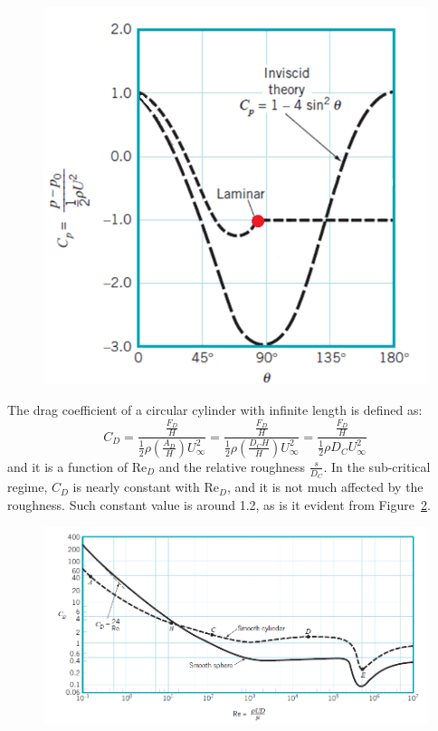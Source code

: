\documentclass[12pt]{article}
\begin{document}
        \begin{figure}[!ht]
                \includegraphics[width=\textwidth]{Pressure_Distribution.png}
                \centering
                \caption{}
                \label{fig:p_d}
        \end{figure}

        The drag coefficient of a circular cylinder with infinite length is defined as: $$C_D = \frac{\frac{F_D}{H}}{\frac{1}{2} \rho \left(\frac{A_D}{H}\right) U_\infty^2} = \frac{\frac{F_D}{H}}{\frac{1}{2} \rho \left(\frac{D_C H}{H}\right) U_\infty^2} = \frac{\frac{F_D}{H}}{\frac{1}{2} \rho D_C U_\infty^2}$$ and it is a function of $\text{Re}_D$ and the relative roughness $\frac{s}{D_C}$. In the sub-critical regime, $C_D$ is nearly constant with $\text{Re}_D$, and it is not much affected by the roughness. Such constant value is around 1.2, as is it evident from Figure~\ref{fig:dragtrend}.

        \begin{figure}[!ht]
                \includegraphics[width=\textwidth]{DragCoefficient_Trend.png}
                \centering
                \caption{}
                \label{fig:dragtrend}
        \end{figure}
\end{document}
